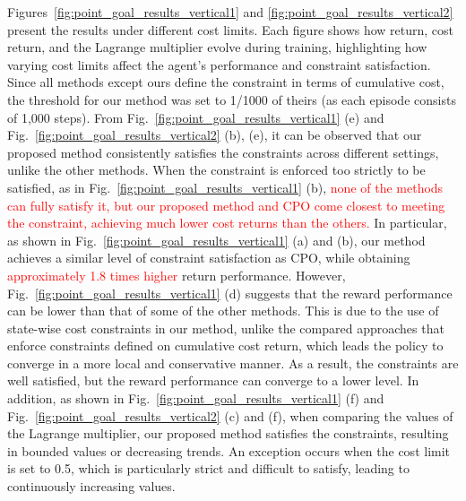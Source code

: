 Figures~\ref{fig:point_goal_results_vertical1} and \ref{fig:point_goal_results_vertical2} present the results under different cost limits.
Each figure shows how return, cost return, and the Lagrange multiplier evolve during training, highlighting how varying cost limits affect the agent's performance and constraint satisfaction.
Since all methods except ours define the constraint in terms of cumulative cost, the threshold for our method was set to 1/1000 of theirs (as each episode consists of 1,000 steps).
From Fig.~\ref{fig:point_goal_results_vertical1} (e) and Fig.~\ref{fig:point_goal_results_vertical2} (b), (e), it can be observed that our proposed method consistently satisfies the constraints across different settings, unlike the other methods.
When the constraint is enforced too strictly to be satisfied, as in Fig.~\ref{fig:point_goal_results_vertical1} (b), \textcolor{red}{none of the methods can fully satisfy it, but our proposed method and CPO come closest to meeting the constraint, achieving much lower cost returns than the others.}
In particular, as shown in Fig.~\ref{fig:point_goal_results_vertical1} (a) and (b), our method achieves a similar level of constraint satisfaction as CPO, while obtaining \textcolor{red}{approximately 1.8 times higher} return performance.  %
However, Fig.~\ref{fig:point_goal_results_vertical1} (d) suggests that the reward performance can be lower than that of some of the other methods.
This is due to the use of state-wise cost constraints in our method, unlike the compared approaches that enforce constraints defined on cumulative cost return, which leads the policy to converge in a more local and conservative manner.
As a result, the constraints are well satisfied, but the reward performance can converge to a lower level.
In addition, as shown in Fig.~\ref{fig:point_goal_results_vertical1} (f) and Fig.~\ref{fig:point_goal_results_vertical2} (c) and (f), when comparing the values of the Lagrange multiplier, our proposed method satisfies the constraints, resulting in bounded values or decreasing trends.
An exception occurs when the cost limit is set to 0.5, which is particularly strict and difficult to satisfy, leading to continuously increasing values.

